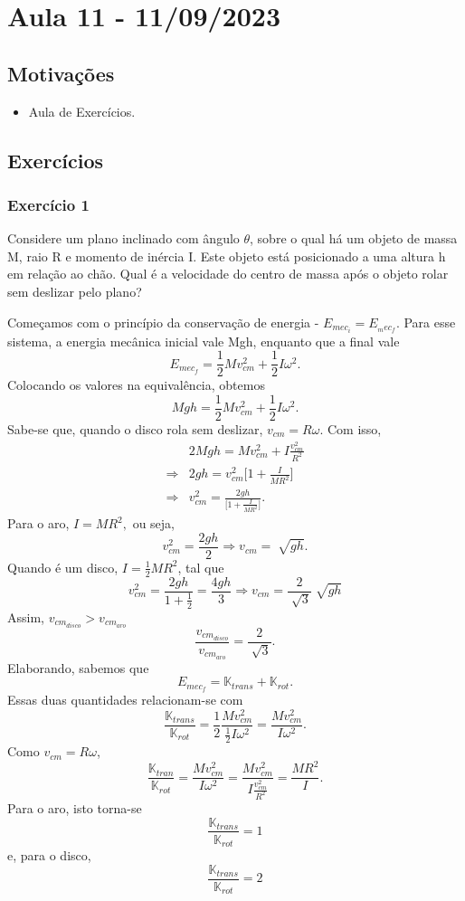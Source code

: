 \documentclass[physicsII_notes.tex]{subfiles}
\begin{document}
\section{Aula 11 - 11/09/2023}
\subsection{Motivações}
\begin{itemize}
	\item Aula de Exercícios.
\end{itemize}
\subsection{Exercícios}
\subsubsection{Exercício 1}
Considere um plano inclinado com ângulo \(\theta \), sobre o qual há um objeto de massa M, raio R e momento de inércia I.
Este objeto está posicionado a uma altura h em relação ao chão. Qual é a velocidade do centro de massa após o objeto rolar sem deslizar pelo plano?

Começamos com o princípio da conservação de energia - \(E_{mec_{i}} = E_{_mec_{f}}\). Para esse sistema, a energia mecânica inicial
vale Mgh, enquanto que a final vale
\[
	E_{mec_{f}} = \frac{1}{2}Mv_{cm}^{2} + \frac{1}{2}I\omega^{2}.
\]
Colocando os valores na equivalência, obtemos
\[
	Mgh = \frac{1}{2}Mv_{cm}^{2} + \frac{1}{2}I\omega^{2}.
\]
Sabe-se que, quando o disco rola sem deslizar, \(v_{cm} = R\omega \). Com isso,
\begin{align*}
	            & 2Mgh = Mv_{cm}^{2} + I \frac{v_{cm}^{2}}{R^{2}}              \\
	\Rightarrow & 2gh = v_{cm}^{2}\biggl[1 + \frac{I}{MR^{2}}\biggr]           \\
	\Rightarrow & v_{cm}^{2} = \frac{2gh}{\biggl[1 + \frac{I}{MR^{2}}\biggr]}.
\end{align*}
Para o aro, \(I = MR^{2},\) ou seja,
\[
	v_{cm}^{2} = \frac{2gh}{2} \Rightarrow v_{cm}=\sqrt[]{gh}.
\]
Quando é um disco, \(I=\frac{1}{2}MR^{2}\), tal que
\[
	v_{cm}^{2} = \frac{2gh}{1 + \frac{1}{2}} = \frac{4gh}{3} \Rightarrow v_{cm} = \frac{2}{\sqrt[]{3}}\sqrt[]{gh}
\]
Assim, \(v_{cm_{disco}} > v_{cm_{aro}}\)
\[
	\frac{v_{cm_{disco}}}{v_{cm_{aro}}} = \frac{2}{\sqrt[]{3}}.
\]
Elaborando, sabemos que
\[
	E_{mec_{f}} = \mathbb{K}_{trans} + \mathbb{K}_{rot}.
\]
Essas duas quantidades relacionam-se com
\[
	\frac{\mathbb{K}_{trans}}{\mathbb{K}_{rot}} = \frac{1}{2}\frac{Mv_{cm}^{2}}{\frac{1}{2}I\omega^{2}} = \frac{Mv_{cm}^{2}}{I\omega^{2}}.
\]
Como \(v_{cm}=R\omega \),
\[
	\frac{\mathbb{K}_{tran}}{\mathbb{K}_{rot}} = \frac{Mv_{cm}^{2}}{I\omega^{2}}=\frac{Mv_{cm}^{2}}{I \frac{v_{cm}^{2}}{R^{2}}} = \frac{MR^{2}}{I}.
\]
Para o aro, isto torna-se
\[
	\frac{\mathbb{K}_{trans}}{\mathbb{K}_{rot}} = 1
\]
e, para o disco,
\[
	\frac{\mathbb{K}_{trans}}{\mathbb{K}_{rot}} = 2
\]
\end{document}
